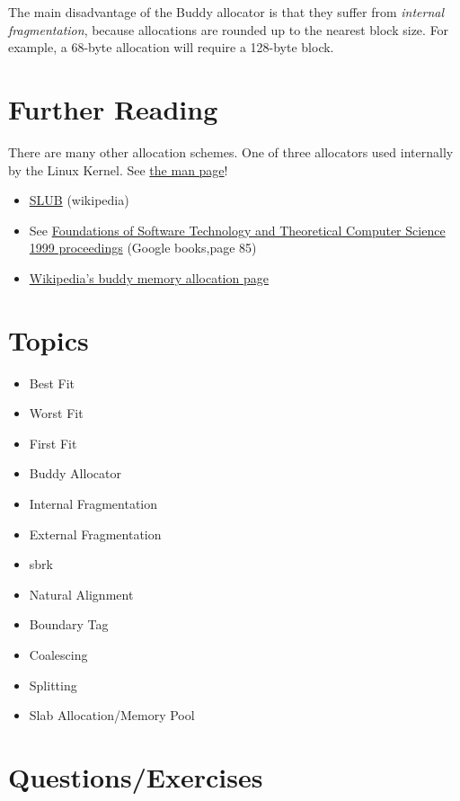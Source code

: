 The main disadvantage of the Buddy allocator is that they suffer from \emph{internal fragmentation}, because allocations are rounded up to the nearest block size. For example, a 68-byte allocation will require a 128-byte block.

\section{Further Reading}

There are many other allocation schemes. One of three allocators used internally by the Linux Kernel. See \href{http://man7.org/linux/man-pages/man3/malloc.3.html}{the man page}!

\begin{itemize}
\tightlist
\item
  \href{http://en.wikipedia.org/wiki/SLUB_\%28software\%29}{SLUB} (wikipedia)
\item
  See \href{http://books.google.com/books?id=0uHME7EfjQEC\&lpg=PP1\&pg=PA85\#v=onepage\&q\&f=false}{Foundations of Software Technology and Theoretical Computer Science 1999 proceedings} (Google books,page 85)
\item
  \href{http://en.wikipedia.org/wiki/Buddy_memory_allocation}{Wikipedia's buddy memory allocation page}
\end{itemize}

\section{Topics}

\begin{itemize}
\tightlist
\item
  Best Fit
\item
  Worst Fit
\item
  First Fit
\item
  Buddy Allocator
\item
  Internal Fragmentation
\item
  External Fragmentation
\item
  sbrk
\item
  Natural Alignment
\item
  Boundary Tag
\item
  Coalescing
\item
  Splitting
\item
  Slab Allocation/Memory Pool
\end{itemize}

\section{Questions/Exercises}

